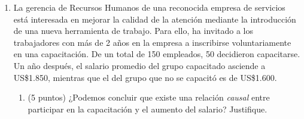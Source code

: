 \documentclass[10pt,a4paper]{article}
\begin{document}
\begin{enumerate}
{    Luego, 
    $$E\left[\hat{b}_{1}\right]=\frac{\operatorname{Cov}(X, Y)}{\operatorname{Var}(X)}=\frac{\operatorname{Cov}\left(X^{*}+u, Y\right)}{\operatorname{Var}\left(X^{*}+u\right)}$$

    Dado que el error es clásico: $\operatorname{Cov}(u, Y)=0$ por lo que:
    $$E\left[\hat{b}_{1}\right]=\frac{\operatorname{Cov}\left(X^{*}, Y\right)}{\operatorname{Var}\left(X^{*}+u\right)}$$
    Además, el denominador lo podemos escribir como la suma de varianzas:
    $$\operatorname{Var}\left(X^{*}+u\right)=\operatorname{Var}\left(X^{*}\right)+\operatorname{Var}(u)$$
    
    Reemplazando $Y$ por el modelo original (1):
    $$E\left[\hat{b}_{1}\right]=\frac{\operatorname{Cov}\left(X^{*}, \beta_{0}+\beta_{1} X^{*}+\epsilon\right)}{\operatorname{Var}\left(X^{*}\right)+\operatorname{Var}(u)}$$
    separando las covarianzas:
    $$E\left[\hat{b}_{1}\right]=\frac{\beta_{1} \operatorname{Cov}\left(X^{*}, X^{*}\right)+\operatorname{Cov}\left(X^{*}, \epsilon\right)}{\operatorname{Var}\left(X^{*}\right)+\operatorname{Var}(u)}$$
    Además, sabemos que $\operatorname{Cov}\left(X^{*}, \epsilon\right)=0$. y $\operatorname{Cov}\left(X^{*}, X^{*}\right)=\operatorname{Var}\left(X^{*}\right)$.
    Entonces:
    $$E\left(\hat{b}_{1}\right)=\beta_{1} \frac{\operatorname{Var}\left(X^{*}\right)}{\operatorname{Var}\left(X^{*}\right)+\operatorname{Var}(u)}=a \cdot \beta_{1}$$
    Por lo tanto, al ser insesgado el estimador de $\beta_1$ cuando el error de medición está en la variable dependiente, y al ser sesgado cuando está en la independiente, entonces Milana tiene la razón. }
    






  \item La gerencia de Recursos Humanos de una reconocida empresa de servicios está interesada en mejorar la calidad de la atención mediante la introducción de una nueva herramienta de trabajo. Para ello, ha invitado a los trabajadores con más de 2 años en la empresa a inscribirse voluntariamente en una capacitación. De un total de 150 empleados, 50 decidieron capacitarse. Un año después, el salario promedio del grupo capacitado asciende a US\$1.850, mientras que el del grupo que no se capacitó es de US\$1.600.
\begin{enumerate}
      \item  (5 puntos) ¿Podemos concluir que existe una relación \textit{causal} entre participar en la capacitación y el aumento del salario? Justifique.


\end{enumerate}
\end{enumerate}
\end{document}
